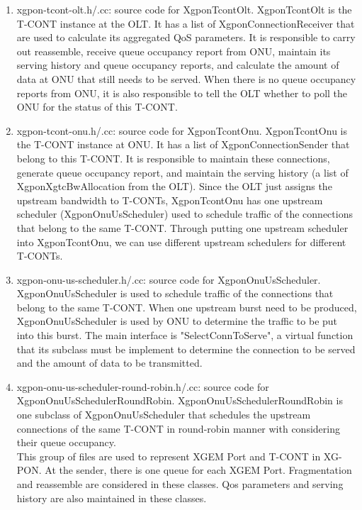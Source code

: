 \begin{enumerate}
 \item xgpon-tcont-olt.h/.cc: source code for {\color{red} XgponTcontOlt}. XgponTcontOlt is the T-CONT instance 
at the OLT. It has a list of XgponConnectionReceiver that are used to calculate its aggregated QoS parameters. 
It is responsible to carry out reassemble, receive queue occupancy report from ONU, maintain its serving history 
and queue occupancy reports, and calculate the amount of data at ONU that still needs to be served. 
When there is no queue occupancy reports from ONU, it is also responsible to tell the OLT whether to 
poll the ONU for the status of this T-CONT.

 \item xgpon-tcont-onu.h/.cc: source code for {\color{red} XgponTcontOnu}. XgponTcontOnu is the T-CONT instance 
at ONU. It has a list of XgponConnectionSender that belong to this T-CONT. It is responsible to maintain these connections, 
generate queue occupancy report, and maintain the serving history (a list of XgponXgtcBwAllocation from the OLT). 
Since the OLT just assigns the upstream bandwidth to T-CONTs, XgponTcontOnu has one upstream scheduler (XgponOnuUsScheduler) 
used to schedule traffic of the connections that belong to the same T-CONT. Through putting one upstream scheduler 
into XgponTcontOnu, we can use different upstream schedulers for different T-CONTs.

 \item xgpon-onu-us-scheduler.h/.cc: source code for {\color{red} XgponOnuUsScheduler}. XgponOnuUsScheduler is used to 
schedule traffic of the connections that belong to the same T-CONT. When one upstream burst need to be produced, 
XgponOnuUsScheduler is used by ONU to determine the traffic to be put into this burst. The main interface is "SelectConnToServe", 
a virtual function that its subclass must be implement to determine the connection to be served and 
the amount of data to be transmitted.

 \item xgpon-onu-us-scheduler-round-robin.h/.cc: source code for {\color{red} XgponOnuUsSchedulerRoundRobin}. 
XgponOnuUsSchedulerRoundRobin is one subclass of XgponOnuUsScheduler that schedules the upstream connections of 
the same T-CONT in round-robin manner with considering their queue occupancy.
\\
{\color{blue} This group of files are used to represent XGEM Port and T-CONT in XG-PON. At the sender, there is 
one queue for each XGEM Port. Fragmentation and reassemble are considered in these classes. Qos parameters and 
serving history are also maintained in these classes. }
\vspace{0.3in}










\end{enumerate}
